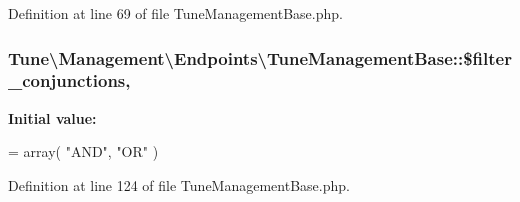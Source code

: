 Definition at line 69 of file Tune\-Management\-Base.\-php.

\hypertarget{classTune_1_1Management_1_1Endpoints_1_1TuneManagementBase_ab9c6bdbfce92a888f93d1c712a400b44}{
\subsubsection[{\$filter\-\_\-conjunctions}]{\setlength{\rightskip}{0pt plus 5cm}Tune\textbackslash{}\-Management\textbackslash{}\-Endpoints\textbackslash{}\-Tune\-Management\-Base\-::\$filter\-\_\-conjunctions\hspace{0.3cm}{\ttfamily [static]}, {\ttfamily [protected]}}}\label{classTune_1_1Management_1_1Endpoints_1_1TuneManagementBase_ab9c6bdbfce92a888f93d1c712a400b44}
{\bfseries Initial value\-:}
\begin{DoxyCode}
= array(
            \textcolor{stringliteral}{"AND"},
            \textcolor{stringliteral}{"OR"}
        )
\end{DoxyCode}


Definition at line 124 of file Tune\-Management\-Base.\-php.

